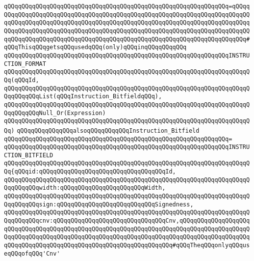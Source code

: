 \verb|qQQqqQQqqQQqqQQqqQQqqQQqqQQqqQQqqQQqqQQqqQQqqQQqqQQqqQQqqQQqqQQq=qQQqqQQqqQQqqQQqqQQqqQQqqQQqqQQqqQQqqQQqqQQqqQQqqQQqqQQqqQQqqQQqqQQqqQQqqQQqqQQqqQQqqQQqqQQqqQQqqQQqqQQqqQQqqQQqqQQqqQQqqQQqqQQqqQQqqQQqqQQqqQQqqQQqqQQqqQQqqQQqqQQqqQQqqQQqqQQqqQQqqQQqqQQqqQQqqQQqqQQqqQQqqQQqqQQqqQQqqQQqqQQqqQQqqQQqqQQqqQQqqQQqqQQqqQQqqQQqqQQqqQQqqQQqqQQqqQQqqQQqqQQq#qQQqThisqQQqgetsqQQqusedqQQq(only)qQQqinqQQqqQQqqQQq|\newline
\verb|qQQqqQQqqQQqqQQqqQQqqQQqqQQqqQQqqQQqqQQqqQQqqQQqqQQqqQQqqQQqqQQqINSTRUCTION_FORMAT|\newline
\verb|qQQqqQQqqQQqqQQqqQQqqQQqqQQqqQQqqQQqqQQqqQQqqQQqqQQqqQQqqQQqqQQqqQQqqQQq(qQQqId,|\newline
\verb|qQQqqQQqqQQqqQQqqQQqqQQqqQQqqQQqqQQqqQQqqQQqqQQqqQQqqQQqqQQqqQQqqQQqqQQqqQQqqQQqList(qQQqInstruction_BitfieldqQQq),|\newline
\verb|qQQqqQQqqQQqqQQqqQQqqQQqqQQqqQQqqQQqqQQqqQQqqQQqqQQqqQQqqQQqqQQqqQQqqQQqqQQqqQQqNull_Or(Expression)|\newline
\verb|qQQqqQQqqQQqqQQqqQQqqQQqqQQqqQQqqQQqqQQqqQQqqQQqqQQqqQQqqQQqqQQqqQQqqQQq)|\newline
\newline
\verb|qQQqqQQqqQQqqQQqalsoqQQqqQQqqQQqInstruction_Bitfield|\newline
\verb|qQQqqQQqqQQqqQQqqQQqqQQqqQQqqQQqqQQqqQQqqQQqqQQqqQQqqQQqqQQqqQQq=|\newline
\verb|qQQqqQQqqQQqqQQqqQQqqQQqqQQqqQQqqQQqqQQqqQQqqQQqqQQqqQQqqQQqqQQqINSTRUCTION_BITFIELD|\newline
\verb|qQQqqQQqqQQqqQQqqQQqqQQqqQQqqQQqqQQqqQQqqQQqqQQqqQQqqQQqqQQqqQQqqQQqqQQq{qQQqid:qQQqqQQqqQQqqQQqqQQqqQQqqQQqqQQqqQQqId,|\newline
\verb|qQQqqQQqqQQqqQQqqQQqqQQqqQQqqQQqqQQqqQQqqQQqqQQqqQQqqQQqqQQqqQQqqQQqqQQqqQQqqQQqwidth:qQQqqQQqqQQqqQQqqQQqqQQqWidth,|\newline
\verb|qQQqqQQqqQQqqQQqqQQqqQQqqQQqqQQqqQQqqQQqqQQqqQQqqQQqqQQqqQQqqQQqqQQqqQQqqQQqqQQqsign:qQQqqQQqqQQqqQQqqQQqqQQqqQQqSignedness,|\newline
\verb|qQQqqQQqqQQqqQQqqQQqqQQqqQQqqQQqqQQqqQQqqQQqqQQqqQQqqQQqqQQqqQQqqQQqqQQqqQQqqQQqcnv:qQQqqQQqqQQqqQQqqQQqqQQqqQQqqQQqCnv,qQQqqQQqqQQqqQQqqQQqqQQqqQQqqQQqqQQqqQQqqQQqqQQqqQQqqQQqqQQqqQQqqQQqqQQqqQQqqQQqqQQqqQQqqQQqqQQqqQQqqQQqqQQqqQQqqQQqqQQqqQQqqQQqqQQqqQQqqQQqqQQqqQQqqQQqqQQqqQQqqQQqqQQqqQQqqQQqqQQqqQQqqQQqqQQqqQQqqQQqqQQqqQQq#qQQqTheqQQqonlyqQQquseqQQqofqQQq'Cnv'|\newline
